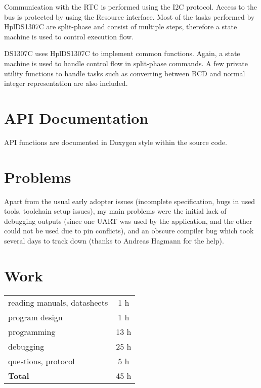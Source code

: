 \documentclass[12pt,a4paper,titlepage,oneside]{article}
\begin{document}
Communication with the RTC is performed using the I2C protocol. Access to the
bus is protected by using the Resource interface. Most of the tasks performed
by HplDS1307C are split-phase and consist of multiple steps, therefore a state
machine is used to control execution flow.

DS1307C uses HplDS1307C to implement common functions. Again, a state machine
is used to handle control flow in split-phase commands. A few private utility
functions to handle tasks such as converting between BCD and normal integer
representation are also included.


\section{API Documentation}

API functions are documented in Doxygen style within the source code.

\section{Problems}

Apart from the usual early adopter issues (incomplete specification, bugs in
used tools, toolchain setup issues), my main problems were the initial lack of
debugging outputs (since one UART was used by the application, and the other
could not be used due to pin conflicts), and an obscure compiler bug which took
several days to track down (thanks to Andreas Hagmann for the help).

\section{Work}

\begin{tabular}{|l|c|}
\hline
reading manuals, datasheets	& 1 h	\\
program design			& 1 h	\\
programming			& 13 h	\\
debugging			& 25 h	\\
questions, protocol		& 5 h	\\
\hline
{\bf Total}			& 45 h	\\
\hline
\end{tabular}
\end{document}
